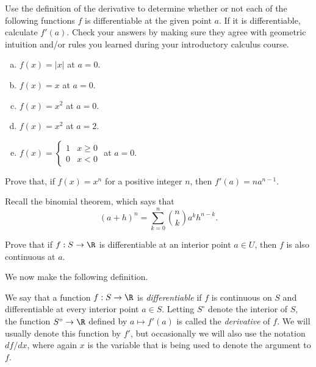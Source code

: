 \begin{exercise}
	Use the definition of the derivative to determine whether or not each of the following functions $f$ is differentiable at the given point $a$. If it is differentiable, calculate $f'(a)$. Check your answers by making sure they agree with geometric intuition and/or rules you learned during your introductory calculus course. 
	\begin{enumerate}[(a)]
		\item $f(x) = |x|$ at $a = 0$.
		\item $f(x) = x$ at $a = 0$. 
		\item $f(x) = x^2$ at $a = 0$. 
		\item $f(x) = x^2$ at $a = 2$. 
		\item $f(x) = \begin{cases} 1 & x \geq 0 \\ 0 & x < 0 \end{cases}$ at $a = 0$. 
	\end{enumerate}
\end{exercise}

\begin{exercise} \label{power-rule-positive}
	Prove that, if $f(x) = x^n$ for a positive integer $n$, then $f'(a) = na^{n-1}$. \begin{hint} Recall the binomial theorem, which says that
	\[ (a+h)^n = \sum_{k = 0}^n \binom{n}{k} a^k h^{n-k}. \]
	\end{hint}
\end{exercise}

\begin{exercise} \label{differentiable-implies-continuous-single}
	Prove that if $f : S \to \R$ is differentiable at an interior point $a \in U$, then $f$ is also continuous at $a$. 
\end{exercise}

We now make the following definition. 

\begin{definition}
	We say that a function $f : S \to \R$ is \emph{differentiable} if $f$ is continuous on $S$ and differentiable at every interior point $a \in S$. Letting $S^\circ$ denote the interior of $S$, the function $S^\circ \to \R$ defined by $a \mapsto f'(a)$ is called the \emph{derivative} of $f$. We will usually denote this function by $f'$, but occasionally we will also use the notation $df/dx$, where again $x$ is the variable that is being used to denote the argument to $f$. 
\end{definition}

